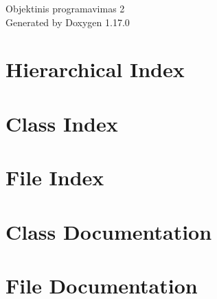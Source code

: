 \documentclass[twoside]{book}
\newcommand{\+}{\discretionary{\mbox{\scriptsize$\hookleftarrow$}}{}{}}
\newcommand{\clearemptydoublepage}{%
    \newpage{\pagestyle{empty}\cleardoublepage}%
  }
\begin{document}
  \raggedbottom
    \hypersetup{pageanchor=false,
                bookmarksnumbered=true,
                pdfencoding=unicode
               }
  \begin{titlepage}
  \vspace*{7cm}
  \begin{center}%
  {\Large Objektinis programavimas 2}\\
  \vspace*{1cm}
  {\large Generated by Doxygen 1.17.0}\\
  \end{center}
  \end{titlepage}
  \clearemptydoublepage
  \tableofcontents
  \clearemptydoublepage
  \hypersetup{pageanchor=true}

\chapter{Hierarchical Index}

\chapter{Class Index}

\chapter{File Index}

\chapter{Class Documentation}



\chapter{File Documentation}
















  \backmatter
  \newpage
  \clearemptydoublepage
  \printindex
\end{document}
